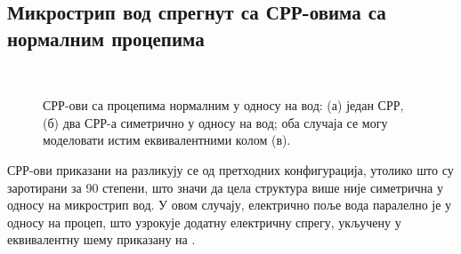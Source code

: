 \documentclass[main.tex]{subfiles}
\begin{document}
\subsection{\label{sec:ML2SPerp} 
Микрострип вод спрегнут са СРР-овима са нормалним процепима}
\begin{figure}[!t]
\centering
{}\hfil
{}\\
\caption{СРР-ови са процепима нормалним у односу на вод: (а) један СРР,
(б) два СРР-а симетрично у односу на вод; оба случаја се могу моделовати истим еквивалентними колом (в).} 
\label{f7}
\end{figure}
СРР-ови приказани на  разликују се од претходних конфигурација, утолико што су заротирани за 90 степени, што значи да цела структура више није симетрична у односу на микрострип вод. У овом случају, електрично поље вода паралелно је у односу на процеп, што узрокује додатну електричну спрегу, укључену у еквивалентну шему приказану на .
\end{document}
